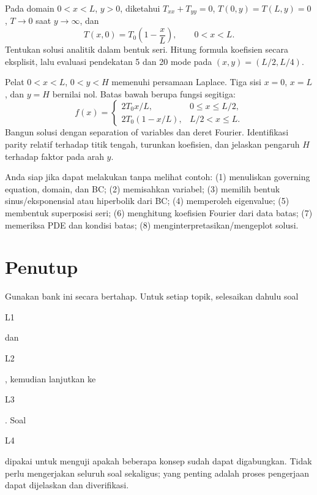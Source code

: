 \documentclass[10pt,a4paper]{article}
\newcommand{\level}[1]{\colorbox{levelbg}{\scriptsize\strut #1}}
\begin{document}
\begin{exam}[title={Mock UAS B - Pelat semi-infinite dengan variasi domain}]
Pada domain $0<x<L$, $y>0$, diketahui $T_{xx}+T_{yy}=0$, $T(0,y)=T(L,y)=0$, $T\to0$ saat $y\to\infty$, dan
\[
T(x,0)=T_0\left(1-\frac{x}{L}\right),\qquad 0<x<L.
\]
Tentukan solusi analitik dalam bentuk seri. Hitung formula koefisien secara eksplisit, lalu evaluasi pendekatan 5 dan 20 mode pada $(x,y)=(L/2,L/4)$.
\end{exam}

\begin{exam}[title={Mock UAS C - Integrasi BVP dan Fourier}]
Pelat $0<x<L$, $0<y<H$ memenuhi persamaan Laplace. Tiga sisi $x=0$, $x=L$, dan $y=H$ bernilai nol. Batas bawah berupa fungsi segitiga:
\[
f(x)=\begin{cases}
2T_0x/L,&0\le x\le L/2,\\
2T_0(1-x/L),&L/2<x\le L.
\end{cases}
\]
Bangun solusi dengan separation of variables dan deret Fourier. Identifikasi parity relatif terhadap titik tengah, turunkan koefisien, dan jelaskan pengaruh $H$ terhadap faktor pada arah $y$.
\end{exam}

\begin{infobox}[title={Checklist kesiapan UAS},colbacktitle=iteraBlue2,coltitle=white,fonttitle=\bfseries]
Anda siap jika dapat melakukan tanpa melihat contoh: (1) menuliskan governing equation, domain, dan BC; (2) memisahkan variabel; (3) memilih bentuk sinus/eksponensial atau hiperbolik dari BC; (4) memperoleh eigenvalue; (5) membentuk superposisi seri; (6) menghitung koefisien Fourier dari data batas; (7) memeriksa PDE dan kondisi batas; (8) menginterpretasikan/mengeplot solusi.
\end{infobox}

\section*{Penutup}
Gunakan bank ini secara bertahap. Untuk setiap topik, selesaikan dahulu soal \level{L1} dan \level{L2}, kemudian lanjutkan ke \level{L3}. Soal \level{L4} dipakai untuk menguji apakah beberapa konsep sudah dapat digabungkan. Tidak perlu mengerjakan seluruh soal sekaligus; yang penting adalah proses pengerjaan dapat dijelaskan dan diverifikasi.
\end{document}
